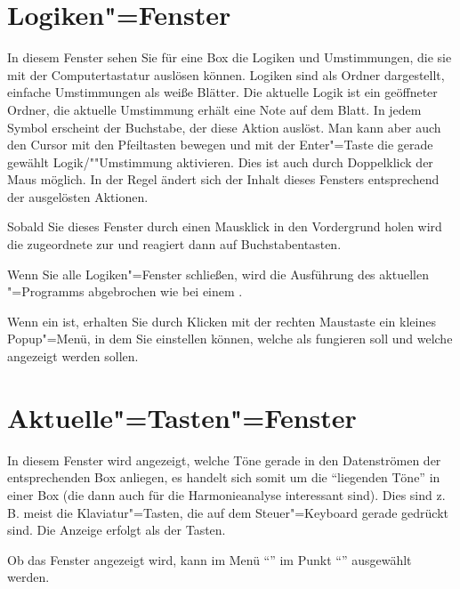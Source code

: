 \section{Logiken"=Fenster}\label{sec:DE_LOGIC}
In diesem Fenster sehen Sie für eine Box die Logiken und Umstimmungen,
die sie mit der Computertastatur auslösen können. Logiken sind als
Ordner dargestellt, einfache Umstimmungen als weiße Blätter. Die
aktuelle Logik ist ein geöffneter Ordner, die aktuelle Umstimmung
erhält eine Note auf dem Blatt. In jedem Symbol erscheint der
Buchstabe, der diese Aktion auslöst. Man kann aber auch den Cursor mit
den Pfeiltasten bewegen und mit der Enter"=Taste die gerade gewählt
Logik/""Umstimmung aktivieren.  Dies ist auch durch Doppelklick der Maus
möglich. In der Regel ändert sich der Inhalt dieses Fensters
entsprechend der ausgelösten Aktionen.


Sobald Sie dieses Fenster durch einen Mausklick in den Vordergrund
holen wird die zugeordnete  zur
 und reagiert dann auf
Buchstabentasten.


Wenn Sie alle Logiken"=Fenster schließen, wird die Ausführung des
aktuellen \mutabor{}"=Programms abgebrochen wie bei einem
.


Wenn ein 
 ist, erhalten Sie durch Klicken
mit der rechten Maustaste ein kleines Popup"=Menü, in dem Sie
einstellen können, welche  als
 fungieren soll und welche
 angezeigt werden sollen.

\section{Aktuelle"=Tasten"=Fenster}\label{sec:DE_KEY}
In diesem Fenster wird angezeigt, welche Töne gerade in den
Datenströmen der entsprechenden Box anliegen, es handelt sich somit um
die "`liegenden Töne"' in einer Box (die dann auch für die
Harmonieanalyse interessant sind). Dies sind z.\,B. meist die
Klaviatur"=Tasten, die auf dem Steuer"=Keyboard gerade gedrückt sind.
Die Anzeige erfolgt als  der
Tasten.


Ob das Fenster angezeigt wird, kann im Menü
"`"' im Punkt
"`"' ausgewählt werden.

